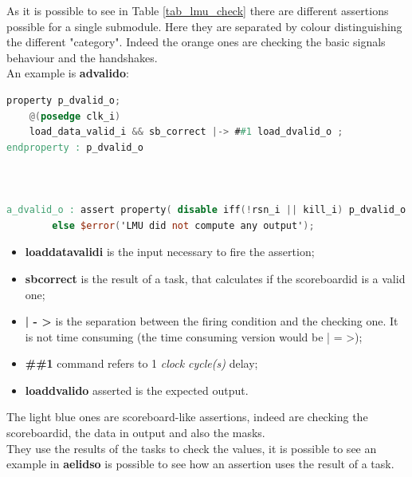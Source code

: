 As it is possible to see in Table \ref{tab_lmu_check} there are different assertions possible for a single submodule. 
Here they are separated by colour distinguishing the different "category".
Indeed the orange ones are checking the basic signals behaviour and the handshakes.\\
An example is \textbf{a\+dvalid\+o}:
\bigskip

\begin{lstlisting}[language=Verilog,style=verilog-style, backgroundcolor=\color{lyel_palette}, frame=tlb]
property p_dvalid_o;
	@(posedge clk_i)
	load_data_valid_i && sb_correct |-> ##1 load_dvalid_o ;
endproperty : p_dvalid_o



a_dvalid_o : assert property( disable iff(!rsn_i || kill_i) p_dvalid_o ) 
        else $error('LMU did not compute any output');

\end{lstlisting}
\bigskip
\begin{itemize}
    \item \textbf{load\+data\+valid\+i} is the input necessary to fire the assertion;
    
    \item \textbf{sb\+correct} is the result of a task, that calculates if the scoreboard\+id is a valid one;
    
    \item \textbf{| - >} is the separation between the firing condition and the checking one. It is not time consuming (the time consuming version would be | = >);
    
    \item \textbf{\#\#1} command refers to 1 \textit{clock cycle(s)} delay;
    
    \item \textbf{load\+dvalid\+o} asserted is the expected output.
\end{itemize}

The light blue ones are scoreboard-like assertions, indeed are checking the scoreboard\+id, the data in output and also the masks.\\
They use the results of the tasks to check the values, it is possible to see an example in \textbf{a\+el\+ids\+o} is possible to see how an assertion uses the result of a task.

\newpage

